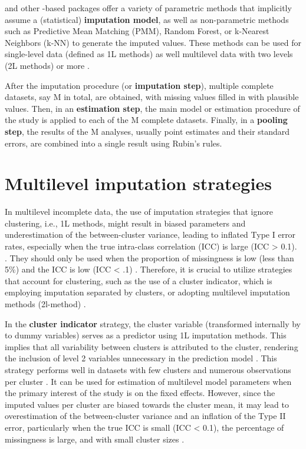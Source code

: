 \documentclass[
  article]{jss}
\begin{document}
 and other -based packages offer a variety of
parametric methods that implicitly assume a (statistical)
\textbf{imputation model}, as well as non-parametric methods such as
Predictive Mean Matching (PMM), Random Forest, or k-Nearest Neighbors
(k-NN) to generate the imputed values. These methods can be used for
single-level data (defined as 1L methods) as well multilevel data with
two levels (2L methods) or more \citep{grun18}.

After the imputation procedure (or \textbf{imputation step}), multiple
complete datasets, say M in total, are obtained, with missing values
filled in with plausible values. Then, in an \textbf{estimation step},
the main model or estimation procedure of the study is applied to each
of the M complete datasets. Finally, in a \textbf{pooling step}, the
results of the M analyses, usually point estimates and their standard
errors, are combined into a single result using Rubin's
rules.\citep{rubin1987}

\section{Multilevel imputation strategies}\label{sec-2strat}

In multilevel incomplete data, the use of imputation strategies that
ignore clustering, i.e., 1L methods, might result in biased parameters
and underestimation of the between-cluster variance, leading to inflated
Type I error rates, especially when the true intra-class correlation
(ICC) is large (ICC \textgreater{} 0.1). \citep{taljaard2008,ende16}.
They should only be used when the proportion of missingness is low (less
than 5\%) and the ICC is low (ICC \textless{} .1) \citep{grun18}.
Therefore, it is crucial to utilize strategies that account for
clustering, such as the use of a cluster indicator, which is employing
imputation separated by clusters, or adopting multilevel imputation
methods (2l-method) \citep{eddingsa}.

In the \textbf{cluster indicator} strategy, the cluster variable
(transformed internally by  to dummy variables) serves as a
predictor using 1L imputation methods. This implies that all variability
between clusters is attributed to the cluster, rendering the inclusion
of level 2 variables unnecessary in the prediction model
\citep{mcneish2019}. This strategy performs well in datasets with few
clusters and numerous observations per cluster \citep{graham2009}. It
can be used for estimation of multilevel model parameters when the
primary interest of the study is on the fixed effects. However, since
the imputed values per cluster are biased towards the cluster mean, it
may lead to overestimation of the between-cluster variance and an
inflation of the Type II error, particularly when the true ICC is small
(ICC \textless{} 0.1), the percentage of missingness is large, and with
small cluster sizes \citep{andridge2011,drec15}.
\end{document}
